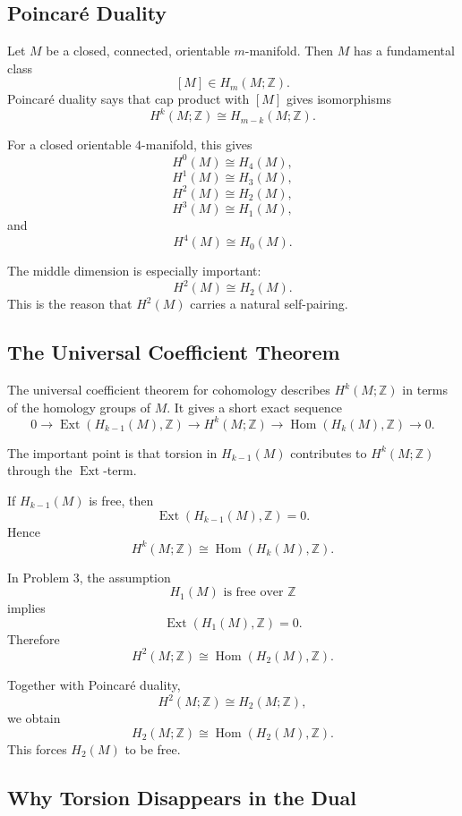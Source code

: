 \documentclass[12pt,a4paper]{article}
\theoremstyle{notespace}
\begin{document}
\subsection{Poincaré Duality}

Let \(M\) be a closed, connected, orientable \(m\)-manifold. Then \(M\) has a
fundamental class
\[
[M]\in H_m(M;\mathbb Z).
\]
Poincaré duality says that cap product with \([M]\) gives isomorphisms
\[
H^k(M;\mathbb Z)\cong H_{m-k}(M;\mathbb Z).
\]

For a closed orientable \(4\)-manifold, this gives
\[
H^0(M)\cong H_4(M),
\]
\[
H^1(M)\cong H_3(M),
\]
\[
H^2(M)\cong H_2(M),
\]
\[
H^3(M)\cong H_1(M),
\]
and
\[
H^4(M)\cong H_0(M).
\]

The middle dimension is especially important:
\[
H^2(M)\cong H_2(M).
\]
This is the reason that \(H^2(M)\) carries a natural self-pairing.

\subsection{The Universal Coefficient Theorem}

The universal coefficient theorem for cohomology describes \(H^k(M;\mathbb Z)\)
in terms of the homology groups of \(M\). It gives a short exact sequence
\[
0
\longrightarrow
\operatorname{Ext}(H_{k-1}(M),\mathbb Z)
\longrightarrow
H^k(M;\mathbb Z)
\longrightarrow
\operatorname{Hom}(H_k(M),\mathbb Z)
\longrightarrow
0.
\]

The important point is that torsion in \(H_{k-1}(M)\) contributes to
\(H^k(M;\mathbb Z)\) through the \(\operatorname{Ext}\)-term.

If \(H_{k-1}(M)\) is free, then
\[
\operatorname{Ext}(H_{k-1}(M),\mathbb Z)=0.
\]
Hence
\[
H^k(M;\mathbb Z)\cong \operatorname{Hom}(H_k(M),\mathbb Z).
\]

In Problem 3, the assumption
\[
H_1(M)\text{ is free over }\mathbb Z
\]
implies
\[
\operatorname{Ext}(H_1(M),\mathbb Z)=0.
\]
Therefore
\[
H^2(M;\mathbb Z)\cong \operatorname{Hom}(H_2(M),\mathbb Z).
\]

Together with Poincaré duality,
\[
H^2(M;\mathbb Z)\cong H_2(M;\mathbb Z),
\]
we obtain
\[
H_2(M;\mathbb Z)\cong \operatorname{Hom}(H_2(M),\mathbb Z).
\]
This forces \(H_2(M)\) to be free.

\subsection{Why Torsion Disappears in the Dual}
\end{document}
